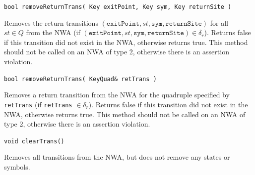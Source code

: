 \documentclass{llncs}
\begin{document}
\begin{description}
  \item\texttt{bool removeReturnTrans( Key exitPoint, Key sym, Key returnSite )} \nopagebreak

    Removes the return transitions $(\texttt{exitPoint},st,\texttt{sym},\texttt{returnSite})$ for all \\$st \in Q$ from the NWA (if $(\texttt{exitPoint},st,\texttt{sym},\texttt{returnSite}) \in \delta_r$).  Returns false if this transition did not exist in the NWA, otherwise returns true.  This method should not be called on an NWA of type 2, otherwise there is an assertion violation.

  \item\texttt{bool removeReturnTrans( KeyQuad\& retTrans )} \nopagebreak

    Removes a return transition from the NWA for the quadruple specified by \texttt{retTrans} (if \texttt{retTrans} $\in \delta_r$).  Returns false if this transition did not exist in the NWA, otherwise returns true.  This method should not be called on an NWA of type 2, otherwise there is an assertion violation.

  \item\texttt{void clearTrans()} \nopagebreak

    Removes all transitions from the NWA, but does not remove any states or symbols. \\

\end{description}
\end{document}
